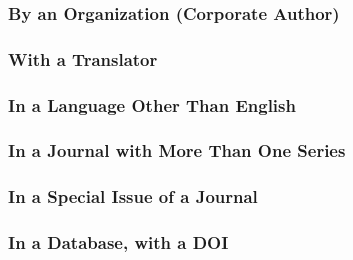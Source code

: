 \documentclass{ltxdockit}
\begin{document}
\subsubsection{By an Organization (Corporate Author)} %
\label{sub:by_an_organization_corporate_author}
\begin{refsection}
	\printbibliography[heading=none]
\end{refsection}
\subsubsection{With a Translator} %
\label{sub:with_a_translator}
\begin{refsection}
	\printbibliography[heading=none]
\end{refsection}
\subsubsection{In a Language Other Than English} %
\label{sub:in_a_language_other_than_english}
\begin{refsection}
	\printbibliography[heading=none]
\end{refsection}
\subsubsection{In a Journal with More Than One Series} %
\label{sub:in_a_journal_with_more_than_one_series}
\begin{refsection}
	\printbibliography[heading=none]
\end{refsection}
\subsubsection{In a Special Issue of a Journal} %
\label{sub:in_a_special_issue_of_a_journal}
\begin{refsection}
	\printbibliography[heading=none]
\end{refsection}
\subsubsection{In a Database, with a DOI} %
\label{sub:in_a_database_with_a_doi}
\begin{refsection}
	\printbibliography[heading=none]
\end{refsection}
\end{document}
